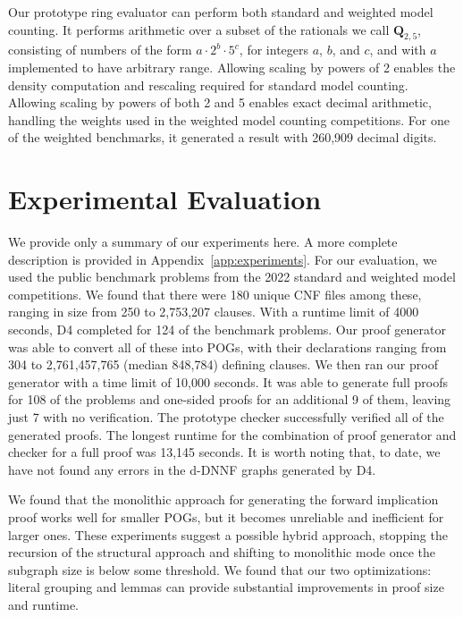 \documentclass[letterpaper,USenglish,cleveref, autoref, thm-restate]{lipics-v2021}
\newcommand{\drational}{\textbf{Q}_{2,5}}
\newcommand{\progname}[1]{\textsc{#1}}
\newcommand{\dfour}{\progname{D4}}
\begin{document}
Our prototype ring evaluator can perform both standard and weighted
model counting.  It performs arithmetic over a subset of the rationals
we call $\drational$, consisting of numbers of the form $a \cdot 2^{b}
\cdot 5^{c}$, for integers $a$, $b$, and $c$, and with $a$ implemented
to have arbitrary range.  Allowing scaling by powers of 2 enables the
density computation and rescaling required for standard model
counting.  Allowing scaling by powers of both 2 and 5 enables exact
decimal arithmetic, handling the weights used in the weighted model
counting competitions.  For one of the weighted benchmarks, it
generated a result with 260,909 decimal digits.

\section{Experimental Evaluation}
\label{sect:experimental}

We provide only a summary of our experiments here.  A more complete
description is provided in Appendix~\ref{app:experiments}\@. For our
evaluation, we used the public benchmark problems from the 2022
standard and weighted model competitions.  We found that there were
180 unique CNF files among these, ranging in size from 250 to
2,753,207 clauses.
With a runtime limit of 4000 seconds, \dfour{} completed for 124 of the
benchmark problems.  Our proof generator was able to convert all of
these into POGs, with their declarations ranging from 304 to
2,761,457,765 (median 848,784) defining clauses.
We then ran our proof generator with a time limit of 10,000 seconds.
It was able to generate full proofs for 108 of the problems and
one-sided proofs for an additional 9 of them, leaving just 7 with no
verification.  The prototype checker successfully verified all of the generated
proofs.  The longest runtime for the combination of proof generator
and checker for a full proof was 13,145 seconds.
It is worth noting that, to date, we have not found
any errors in the d-DNNF graphs generated by \dfour{}.

We found that the monolithic approach for generating the forward
implication proof works well for smaller POGs, but it becomes
unreliable and inefficient for larger ones.  These experiments suggest
a possible hybrid approach, stopping the recursion of the structural
approach and shifting to monolithic mode once the subgraph size is below some
threshold.  We found that our two optimizations: literal grouping and
lemmas can provide substantial improvements in proof size and runtime.
\end{document}
